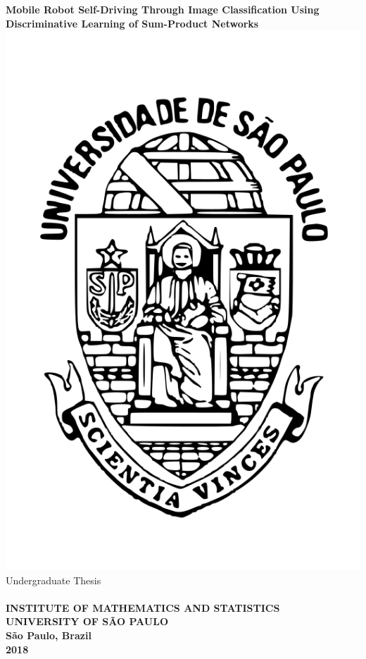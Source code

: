 \thispagestyle{empty}
\begin{center}
  \vspace{-3.0cm}
  {\textbf{\LARGE Mobile Robot Self-Driving Through Image Classification Using
        Discriminative Learning of Sum-Product Networks}}\\
  \vspace{2.0cm}
  {\includegraphics[scale=0.2]{imgs/logo-usp.png}}\\
  \Large Undergraduate Thesis\\
  \vspace{2.5cm}
  \large{}\\
  \vspace{2.5cm}
  \centering
  {\textbf{\uppercase{Institute of Mathematics and Statistics\\University of São Paulo}}}\\
  \vspace{1.5cm}
  {\Large\textbf{São Paulo, Brazil}}\\
  \vspace{0.25cm}
  {\Large\textbf{2018}}\\
\end{center}

